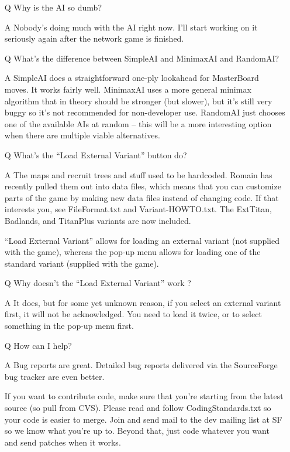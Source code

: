 \documentclass{article}
\begin{document}
\begin{itemize}
\item[Q] Why is the AI so dumb?

\item[A] Nobody's doing much with the AI right now. I'll start working
 on it seriously again after the network game is finished.


\item[Q] What's the difference between SimpleAI and MinimaxAI and RandomAI?

\item[A] SimpleAI does a straightforward one-ply lookahead for MasterBoard
 moves. It works fairly well. MinimaxAI uses a more general minimax 
 algorithm that in theory should be stronger (but slower), but it's 
 still very buggy so it's not recommended for non-developer use. 
 RandomAI just chooses one of the available AIs at random -- this 
 will be a more interesting option when there are multiple viable 
 alternatives.


\item[Q] What's the ``Load External Variant'' button do? 

\item[A] The maps and recruit trees and stuff used to be hardcoded. Romain
 has recently pulled them out into data files, which means that you
 can customize parts of the game by making new data files instead of
 changing code. If that interests you, see FileFormat.txt and
 Variant-HOWTO.txt. The ExtTitan, Badlands, and TitanPlus variants 
 are now included.

 ``Load External Variant'' allows for loading an external variant
 (not supplied with the game), whereas the pop-up menu allows
 for loading one of the standard variant (supplied with the game).


\item[Q] Why doesn't the ``Load External Variant'' work ?

\item[A] It does, but for some yet unknown reason, if you select an external
 variant first, it will not be acknowledged. You need to load it
 twice, or to select something in the pop-up menu first.


\item[Q] How can I help?

\item[A] Bug reports are great. Detailed bug reports delivered via the 
 SourceForge bug tracker are even better. 
 
 If you want to contribute code, make sure that you're starting 
 from the latest source (so pull from CVS). Please read and follow
 CodingStandards.txt so your code is easier to merge. Join and
 send mail to the dev mailing list at SF so we know what you're
 up to. Beyond that, just code whatever you want and send 
 patches when it works.

\end{itemize}
\end{document}
